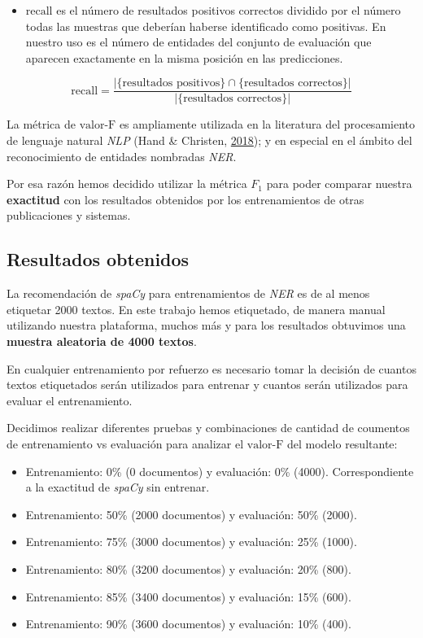 \documentclass[12pt,a4paper,]{scrartcl}
\providecommand{\tightlist}{%
  \setlength{\itemsep}{0pt}\setlength{\parskip}{0pt}}
\begin{document}
\begin{itemize}
\tightlist
\item
  \(\text{recall}\) es el número de resultados positivos correctos dividido por el número todas las muestras que deberían haberse identificado como positivas.
  En nuestro uso es el número de entidades del conjunto de evaluación que aparecen exactamente en la misma posición en las predicciones.
\end{itemize}

\[
\text{recall}=\frac{|\{\text{resultados positivos}\}\cap\{\text{resultados correctos}\}|}{|\{\text{resultados correctos}\}|}
\]

La métrica de \(\text{valor-F}\) es ampliamente utilizada en la literatura del procesamiento de lenguaje natural \emph{NLP} (Hand \& Christen, \protect\hyperlink{ref-pub_1084928040}{2018}); y en especial en el ámbito del reconocimiento de entidades nombradas \emph{NER}.

Por esa razón hemos decidido utilizar la métrica \(F_1\) para poder comparar nuestra \textbf{exactitud} con los resultados obtenidos por los entrenamientos de otras publicaciones y sistemas.

\hypertarget{result-data}{%
\subsection{Resultados obtenidos}\label{result-data}}

La recomendación de \emph{spaCy} para entrenamientos de \emph{NER} es de al menos etiquetar 2000 textos. En este trabajo hemos etiquetado, de manera manual utilizando nuestra plataforma, muchos más y para los resultados obtuvimos una \textbf{muestra aleatoria de 4000 textos}.

En cualquier entrenamiento por refuerzo es necesario tomar la decisión de cuantos textos etiquetados serán utilizados para entrenar y cuantos serán utilizados para evaluar el entrenamiento.

Decidimos realizar diferentes pruebas y combinaciones de cantidad de coumentos de entrenamiento vs evaluación para analizar el \(\text{valor-F}\) del modelo resultante:

\begin{itemize}
\tightlist
\item
  Entrenamiento: 0\% (0 documentos) y evaluación: 0\% (4000). Correspondiente a la exactitud de \emph{spaCy} sin entrenar.
\item
  Entrenamiento: 50\% (2000 documentos) y evaluación: 50\% (2000).
\item
  Entrenamiento: 75\% (3000 documentos) y evaluación: 25\% (1000).
\item
  Entrenamiento: 80\% (3200 documentos) y evaluación: 20\% (800).
\item
  Entrenamiento: 85\% (3400 documentos) y evaluación: 15\% (600).
\item
  Entrenamiento: 90\% (3600 documentos) y evaluación: 10\% (400).
\end{itemize}
\end{document}
